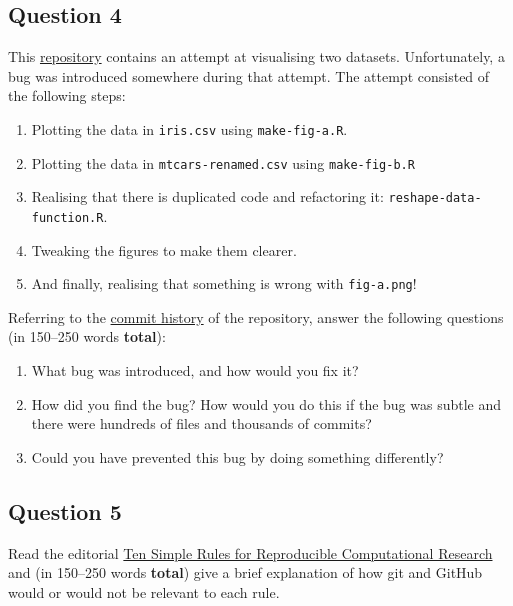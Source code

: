 \documentclass[11pt,onecolumn]{scrartcl}
\begin{document}
\subsection{Question 4}
\label{sec:orgf2e5c51}

This \href{https://github.com/aezarebski/biology-github-tutorial}{repository} contains an attempt at visualising two datasets. Unfortunately,
a bug was introduced somewhere during that attempt. The attempt consisted of the
following steps:

\begin{enumerate}
\item Plotting the data in \texttt{iris.csv} using \texttt{make-fig-a.R}.
\item Plotting the data in \texttt{mtcars-renamed.csv} using \texttt{make-fig-b.R}
\item Realising that there is duplicated code and refactoring it:
\texttt{reshape-data-function.R}.
\item Tweaking the figures to make them clearer.
\item And finally, realising that something is wrong with \texttt{fig-a.png}!
\end{enumerate}

Referring to the \href{https://github.com/aezarebski/biology-github-tutorial/commits/main}{commit history} of the repository, answer the following
questions (in 150--250 words \textbf{total}):

\begin{enumerate}
\item What bug was introduced, and how would you fix it?
\item How did you find the bug? How would you do this if the bug was subtle and
there were hundreds of files and thousands of commits?
\item Could you have prevented this bug by doing something differently?
\end{enumerate}

\subsection{Question 5}
\label{sec:org1a3b846}

Read the editorial \href{https://doi.org/10.1371/journal.pcbi.1003285}{Ten Simple Rules for Reproducible Computational Research} and
(in 150--250 words \textbf{total}) give a brief explanation of how git and GitHub would
or would not be relevant to each rule.
\end{document}
